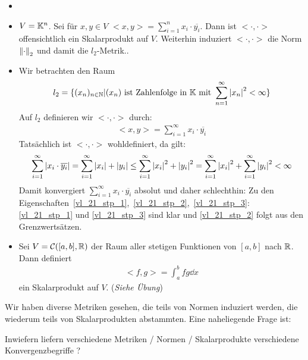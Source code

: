 \begin{Beispiel}{
	\begin{itemize}
		\item[ ]
		\item $V = \mathbb{K}^n$. Sei für $x,y \in V$ $<x,y> = \sum_{i=1}^n x_i \cdot 
		\overline{y_i}$. Dann ist $<\cdot, \cdot>$ offensichtlich ein Skalarprodukt 
		auf $V$. Weiterhin induziert $<\cdot, \cdot>$ die Norm $\norm{\cdot}_2$ und 
		damit die $l_2$-Metrik..
		\item Wir betrachten den Raum
		\begin{align*}
			l_2 = \{ (x_n)_{n \in \mathbb{N}} \vert (x_n) \text{ ist Zahlenfolge in }
				\mathbb{K} \text{ mit } \sum_{n=1}^\infty \abs{x_n}^2 < \infty\}
		\end{align*}
		Auf $l_2$ definieren wir $<\cdot,\cdot>$ durch:
		\begin{align*}
			<x,y> = \sum_{i=1}^\infty x_i \cdot\overline{y_i}
		\end{align*}
		Tatsächlich ist $<\cdot,\cdot>$ wohldefiniert, da gilt: 
		\begin{align*}
			\sum_{i=1}^\infty \abs{x_i \cdot \overline{y_i}} = \sum_{i = 1}^\infty 
			\abs{x_i} + \abs{y_i} \leq \sum_{i = 1}^\infty \abs{x_i}^2 + \abs{y_i}^2 
			= \sum_{i = 1}^\infty \abs{x_i}^2 + \sum_{i=1}^{\infty} \abs{y_i}^2 < \infty
		\end{align*}
		Damit konvergiert $\sum_{i=1}^\infty x_i \cdot \overline{y_i}$ absolut und 
		daher schlechthin: Zu den Eigenschaften~\ref{vl_21_stp_1},~\ref{vl_21_stp_2},~\ref{vl_21_stp_3}: \ref{vl_21_stp_1} und \ref{vl_21_stp_3} sind 
		klar und \ref{vl_21_stp_2} folgt aus den Grenzwertsätzen.
		\item Sei $ V = \mathcal{C}([a,b], \mathbb{R})$ der Raum aller stetigen Funktionen von $[a,b]$ nach $\mathbb{R}$. Dann definiert 
		\begin{align*}
			<f,g> = \int_a^b f g \dd{x}
		\end{align*}
		ein Skalarprodukt auf $V$. (\textit{Siehe Übung})
	\end{itemize}
}\end{Beispiel}

Wir haben diverse Metriken gesehen, die teils von Normen induziert werden, die wiederum teils von Skalarprodukten abstammten. Eine naheliegende Frage ist:
\begin{center}
	Inwiefern liefern verschiedene Metriken / Normen / Skalarprodukte verschiedene Konvergenzbegriffe ?
\end{center}

